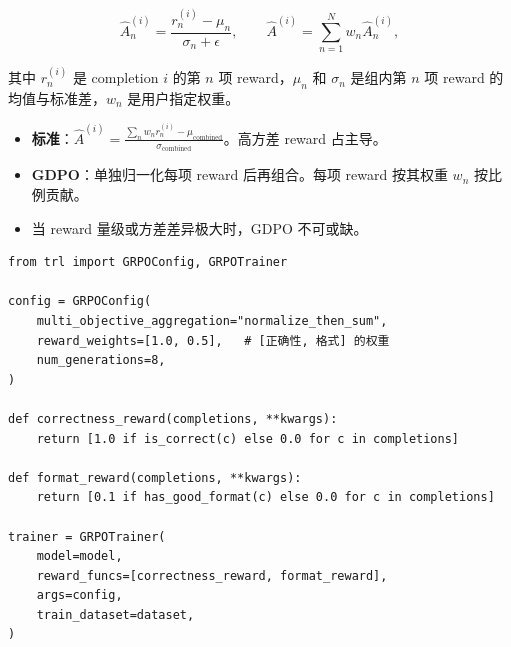 \[
\boxed{
    \hat{A}_n^{(i)} = \frac{r_n^{(i)} - \mu_n}{\sigma_n + \epsilon}, \qquad
    \hat{A}^{(i)} = \sum_{n=1}^N w_n \hat{A}_n^{(i)},
  }
\]

其中 $r_n^{(i)}$ 是 completion $i$ 的第 $n$ 项 reward，$\mu_n$ 和 $\sigma_n$ 是组内第 $n$ 项 reward 的均值与标准差，$w_n$ 是用户指定权重。

\begin{keybox}
\begin{itemize}
  \item \textbf{标准}：$\hat{A}^{(i)} = \frac{\sum_n w_n r_n^{(i)} - \mu_{\text{combined}}}{\sigma_{\text{combined}}}$。高方差 reward 占主导。
  \item \textbf{GDPO}：单独归一化每项 reward 后再组合。每项 reward 按其权重 $w_n$ 按比例贡献。
  \item 当 reward 量级或方差差异极大时，GDPO 不可或缺。
\end{itemize}
\end{keybox}

\begin{examplebox}
\begin{lstlisting}[style=pythonstyle]
from trl import GRPOConfig, GRPOTrainer

config = GRPOConfig(
    multi_objective_aggregation="normalize_then_sum",
    reward_weights=[1.0, 0.5],   # [正确性, 格式] 的权重
    num_generations=8,
)

def correctness_reward(completions, **kwargs):
    return [1.0 if is_correct(c) else 0.0 for c in completions]

def format_reward(completions, **kwargs):
    return [0.1 if has_good_format(c) else 0.0 for c in completions]

trainer = GRPOTrainer(
    model=model,
    reward_funcs=[correctness_reward, format_reward],
    args=config,
    train_dataset=dataset,
)
\end{lstlisting}
\end{examplebox}

